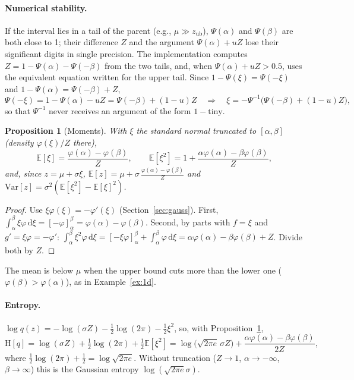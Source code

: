 \documentclass[11pt,a4paper]{article}
\numberwithin{equation}{section}
\theoremstyle{plain}
\newtheorem{proposition}{Proposition}[section]
\theoremstyle{definition}
\theoremstyle{remark}
\newcommand{\E}{\mathbb{E}}
\newcommand{\Var}{\mathrm{Var}}
\newcommand{\Hent}{\mathrm{H}}
\newcommand{\dd}{\,\mathrm{d}}
\newcommand{\zub}{z_{\text{ub}}}
\begin{document}
\paragraph{Numerical stability.} If the interval lies in a tail of the parent (e.g., $\mu\gg\zub$), $\Psi(\alpha)$ and $\Psi(\beta)$ are both close to 1; their difference $Z$ and the argument $\Psi(\alpha)+uZ$ lose their significant digits in single precision. The implementation computes $Z=1-\Psi(\alpha)-\Psi(-\beta)$ from the two tails, and, when $\Psi(\alpha)+uZ>0.5$, uses the equivalent equation written for the upper tail. Since $1-\Psi(\xi)=\Psi(-\xi)$ and $1-\Psi(\alpha)=\Psi(-\beta)+Z$,
\begin{equation*}
\Psi(-\xi)=1-\Psi(\alpha)-uZ=\Psi(-\beta)+(1-u)Z\quad\Longrightarrow\quad\xi=-\Psi^{-1}\big(\Psi(-\beta)+(1-u)Z\big),
\end{equation*}
so that $\Psi^{-1}$ never receives an argument of the form $1-\text{tiny}$.

\begin{proposition}[Moments]
\label{prop:tn_moments}
With $\xi$ the standard normal truncated to $[\alpha,\beta]$ (density $\varphi(\xi)/Z$ there),
\begin{equation}
\E[\xi]=\frac{\varphi(\alpha)-\varphi(\beta)}{Z},\qquad\E[\xi^2]=1+\frac{\alpha\varphi(\alpha)-\beta\varphi(\beta)}{Z},
\end{equation}
and, since $z=\mu+\sigma\xi$, $\E[z]=\mu+\sigma\,\frac{\varphi(\alpha)-\varphi(\beta)}{Z}$ and $\Var[z]=\sigma^2(\E[\xi^2]-\E[\xi]^2)$.
\end{proposition}
\begin{proof}
Use $\xi\varphi(\xi)=-\varphi'(\xi)$ (Section~\ref{sec:gauss}). First, $\int_\alpha^\beta\xi\varphi\dd\xi=[-\varphi]_\alpha^\beta=\varphi(\alpha)-\varphi(\beta)$. Second, by parts with $f=\xi$ and $g'=\xi\varphi=-\varphi'$:
$\int_\alpha^\beta\xi^2\varphi\dd\xi=[-\xi\varphi]_\alpha^\beta+\int_\alpha^\beta\varphi\dd\xi=\alpha\varphi(\alpha)-\beta\varphi(\beta)+Z$. Divide both by $Z$.
\end{proof}
The mean is below $\mu$ when the upper bound cuts more than the lower one ($\varphi(\beta)>\varphi(\alpha)$), as in Example~\ref{ex:1d}.

\paragraph{Entropy.} $\log q(z)=-\log(\sigma Z)-\tfrac12\log(2\pi)-\tfrac12\xi^2$, so, with Proposition~\ref{prop:tn_moments},
\begin{equation}
\Hent[q]=\log(\sigma Z)+\tfrac12\log(2\pi)+\tfrac12\E[\xi^2]
=\log\big(\sqrt{2\pi e}\,\sigma Z\big)+\frac{\alpha\varphi(\alpha)-\beta\varphi(\beta)}{2Z},
\label{eq:tn_entropy}
\end{equation}
where $\tfrac12\log(2\pi)+\tfrac12=\log\sqrt{2\pi e}$. Without truncation ($Z\to1$, $\alpha\to-\infty$, $\beta\to\infty$) this is the Gaussian entropy $\log(\sqrt{2\pi e}\sigma)$.
\end{document}
